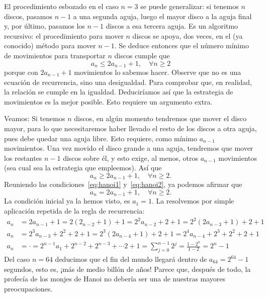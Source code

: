 \documentclass{article}
\begin{document}
El procedimiento esbozado en el caso $n=3$ se puede generalizar: si tenemos $n$ discos, pasamos $n-1$ a una segunda aguja, luego el mayor disco a la aguja final y, por último, pasamos los $n-1$ discos a esa tercera aguja. Es un algoritmo recursivo: el procedimiento para mover $n$ discos se apoya, dos veces, en el (ya conocido) método para mover $n-1$. Se deduce entonces que el número mínimo de movimientos para transportar $n$ discos cumple que
\begin{equation}\label{eq:hanoi1}
	a_{n}\leq 2a_{n-1}+1,\quad\forall n\geq2
\end{equation} porque con $2a_{n-1}+1$ movimientos lo sabemos hacer. Observe que no es una ecuación de recurrencia, sino una desigualdad. Para comprobar que, en realidad, la
relación se cumple en la igualdad. Deduciríamos así que la estrategia de movimientos es la mejor posible. Esto requiere un argumento extra.

Veamos: Si tenemos $n$ discos, en algún momento tendremos que mover el disco mayor, para lo que necesitaremos haber llevado el resto de los discos a otra aguja, pues debe quedar una aguja libre. Esto requiere, como mínimo $a_{n-1}$ movimientos. Una vez movido el disco grande a una aguja, tendremos que mover los restantes $n-1$ discos sobre él, y esto exige, al menos, otros $a_{n-1}$ movimientos (sea cual sea la estrategia que empleemos). Así que
\begin{equation}\label{eq:hanoi2}
	a_{n}\geq 2a_{n-1}+1,\quad\forall n \geq 2.
\end{equation}
Reuniendo las condiciones~\eqref{eq:hanoi1} y~\eqref{eq:hanoi2}, ya podemos afirmar que
\begin{equation}
	a_{n}= 2a_{n-1}+1,\quad\forall n\geq2.
\end{equation}
La condición inicial ya la hemos visto, es $a_{1}=1$. La resolvemos por simple aplicación repetida de la regla de recurrencia:
\begin{align*}
	a_{n}&=2a_{n-1}+1=2\left(2_{n-2}+1\right)+1=2^{2}a_{n-2}+2+1=2^{2}\left(2a_{n-3}+1\right)+2+1\\
	a_{n}&= 2^{3}a_{n-3}+2^{2}+2+1=2^{3}(2a_{n-4}+1)+2+1=2^{4}a_{n-4}+2^{3}+2^{2}+2+1\\
	a_{n}&=\cdot=2^{n-1}a_{1}+2^{n-2}+2^{n-3}+\cdots2+1=\sum_{j=0}^{n-1}2^j=\frac{1-2^{n}}{1-2}=2^{n}-1
\end{align*}
Del caso $n=64$ deducimos que el fin del mundo llegará dentro de $a_{64}= 2^{64}-1$ segundos, esto es, ¡más de medio billón de años! Parece que, después de todo, la profecía de los monjes de Hanoi no debería ser una de nuestras mayores preocupaciones.
\end{document}
